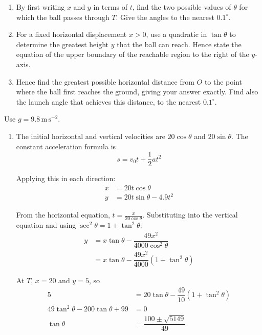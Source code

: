 \documentclass[leqno]{article}
\begin{document}
\begin{enumerate}[
  label=\textbf{\arabic*.},
  leftmargin=*,
  topsep=0pt,
  partopsep=0pt,
  parsep=0pt
]
\begin{enumerate}[label=\textbf{(\alph*)}]
\item By first writing $x$ and $y$ in terms of $t$, find the two possible values of $\theta$ for which the ball passes through $T$. Give the angles to the nearest $0.1^\circ$.  \\
\item For a fixed horizontal displacement $x>0$, use a quadratic in $\tan\theta$ to determine the greatest height $y$ that the ball can reach. Hence state the equation of the upper boundary of the reachable region to the right of the $y$-axis.  \\
\item Hence find the greatest possible horizontal distance from $O$ to the point where the ball first reaches the ground, giving your answer exactly. Find also the launch angle that achieves this distance, to the nearest $0.1^\circ$.  \\
\end{enumerate}

\vspace*{10pt}

\begin{djsSolution}
Use \(g=9.8\,\mathrm{m\,s^{-2}}\).
\begin{enumerate}[label=\textbf{(\alph*)}, start=1]
\item The initial horizontal and vertical velocities are \(20\cos\theta\) and \(20\sin\theta\). The constant acceleration formula is
\[
s=v_0t+\frac12at^2
\]

Applying this in each direction:
\begin{align*}
x&=20t\cos\theta\\
y&=20t\sin\theta-4.9t^2
\end{align*}

From the horizontal equation, \(t=\frac{x}{20\cos\theta}\). Substituting into the vertical equation and using \(\sec^2\theta=1+\tan^2\theta\):
\begin{align*}
y&=x\tan\theta-\dfrac{49x^2}{4000\cos^2\theta}\\
&=x\tan\theta-\dfrac{49x^2}{4000}\left(1+\tan^2\theta\right)
\end{align*}

At \(T\), \(x=20\) and \(y=5\), so
\begin{align*}
5&=20\tan\theta-\dfrac{49}{10}\left(1+\tan^2\theta\right)\\
49\tan^2\theta-200\tan\theta+99&=0\\
\tan\theta&=\dfrac{100\pm\sqrt{5149}}{49}
\end{align*}


\end{enumerate}
\end{djsSolution}
\end{enumerate}
\end{document}
